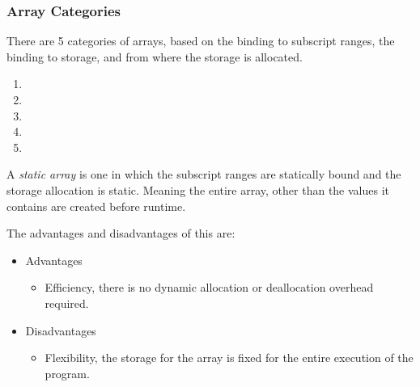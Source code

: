 \subsubsection{Array Categories}\label{subsubsec:Arrays-Categories}
There are 5 categories of arrays, based on the binding to subscript ranges, the binding to storage, and from where the storage is allocated.
\begin{enumerate}[noitemsep]
\item {}
\item {}
\item {}
\item {}
\item {}
\end{enumerate}

\begin{definition}\label{def:Static_Array}
  A \emph{static array} is one in which the subscript ranges are statically bound and the storage allocation is static.
  Meaning the entire array, other than the values it contains are created before runtime.

  The advantages and disadvantages of this are:
  \begin{itemize}[nosep,noitemsep]
  \item Advantages
    \begin{itemize}[nosep,noitemsep]
    \item Efficiency, there is no dynamic allocation or deallocation overhead required.
    \end{itemize}
  \item Disadvantages
    \begin{itemize}[nosep,noitemsep]
    \item Flexibility, the storage for the array is fixed for the entire execution of the program.
    \end{itemize}
  \end{itemize}
\end{definition}

